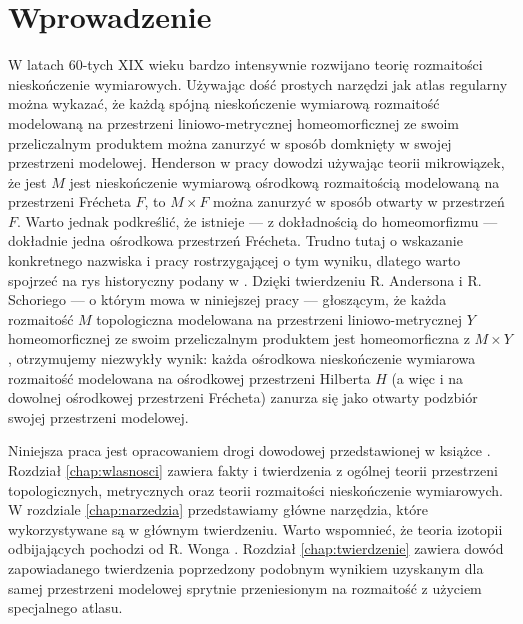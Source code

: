 \section{Wprowadzenie}
W latach 60-tych XIX wieku bardzo intensywnie rozwijano teorię rozmaitości nieskończenie wymiarowych. Używając dość prostych narzędzi jak atlas regularny można wykazać, że każdą spójną nieskończenie wymiarową rozmaitość modelowaną na przestrzeni liniowo-metrycznej homeomorficznej ze swoim przeliczalnym produktem można zanurzyć w sposób domknięty w swojej przestrzeni modelowej. Henderson w pracy \cite{hen} dowodzi używając teorii mikrowiązek, że jest $M$ jest nieskończenie wymiarową ośrodkową rozmaitością modelowaną na przestrzeni Frécheta $F$, to $M\times F$ można zanurzyć w sposób otwarty w przestrzeń $F$. Warto jednak podkreślić, że istnieje --- z dokładnością do homeomorfizmu --- dokładnie jedna ośrodkowa przestrzeń Frécheta. Trudno tutaj o wskazanie konkretnego nazwiska i pracy rostrzygającej o tym wyniku, dlatego warto spojrzeć na rys historyczny podany w \cite{bp}. Dzięki twierdzeniu R. Andersona i R. Schoriego --- o którym mowa w niniejszej pracy --- głoszącym, że każda rozmaitość $M$ topologiczna modelowana na przestrzeni liniowo-metrycznej $Y$ homeomorficznej ze swoim przeliczalnym produktem jest homeomorficzna z $M\times Y$, otrzymujemy niezwykły wynik: każda ośrodkowa nieskończenie wymiarowa rozmaitość modelowana na ośrodkowej przestrzeni Hilberta $H$ (a więc i na dowolnej ośrodkowej przestrzeni Frécheta) zanurza się jako otwarty podzbiór swojej przestrzeni modelowej.

Niniejsza praca jest opracowaniem drogi dowodowej przedstawionej w książce \cite{bp}. Rozdział \ref{chap:wlasnosci} zawiera fakty i twierdzenia z ogólnej teorii przestrzeni topologicznych, metrycznych oraz teorii rozmaitości nieskończenie wymiarowych. W rozdziale \ref{chap:narzedzia} przedstawiamy główne narzędzia, które wykorzystywane są w głównym twierdzeniu. Warto wspomnieć, że teoria izotopii odbijających pochodzi od R. Wonga \cite{won}. Rozdział \ref{chap:twierdzenie} zawiera dowód zapowiadanego twierdzenia poprzedzony podobnym wynikiem uzyskanym dla samej przestrzeni modelowej sprytnie przeniesionym na rozmaitość z użyciem specjalnego atlasu.